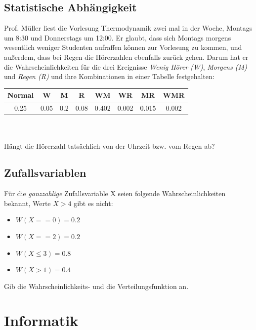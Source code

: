 \documentclass[11pt, a4paper]{article}
\begin{document}
\subsection{Statistische Abhängigkeit}
Prof. Müller liest die Vorlesung Thermodynamik zwei mal in der Woche, Montags um 8:30 und Donnerstags um 12:00. Er glaubt, dass sich Montags morgens wesentlich weniger Studenten aufraffen können zur Vorlesung zu kommen, und außerdem, dass bei Regen die Hörerzahlen ebenfalls zurück gehen. Darum hat er die Wahrscheinlichkeiten für die drei Ereignisse \emph{Wenig Hörer (W)}, \emph{Morgens (M)} und \emph{Regen (R)} und ihre Kombinationen in einer Tabelle festgehalten: \\

\begin{tabular}{c|c|c|c|c|c|c|c}
	Normal & W & M & R & WM & WR & MR & WMR \\ \hline
	0.25 & 0.05 & 0.2 & 0.08 & 0.402 & 0.002 & 0.015 & 0.002
\end{tabular} \\
\\
Hängt die Hörerzahl tatsächlich von der Uhrzeit bzw. vom Regen ab?

\subsection{Zufallsvariablen}
Für die \emph{ganzzahlige} Zufallsvariable X seien folgende Wahrscheinlichkeiten bekannt, Werte $X > 4$ gibt es nicht:
\begin{itemize}
	\item $W(X == 0) = 0.2$
	\item $W(X == 2) = 0.2$
	\item $W(X \leq 3) = 0.8$
	\item $W(X > 1) = 0.4$
\end{itemize}
Gib die Wahrscheinlichkeits- und die Verteilungsfunktion an.

\newpage
\section{Informatik}
\end{document}
